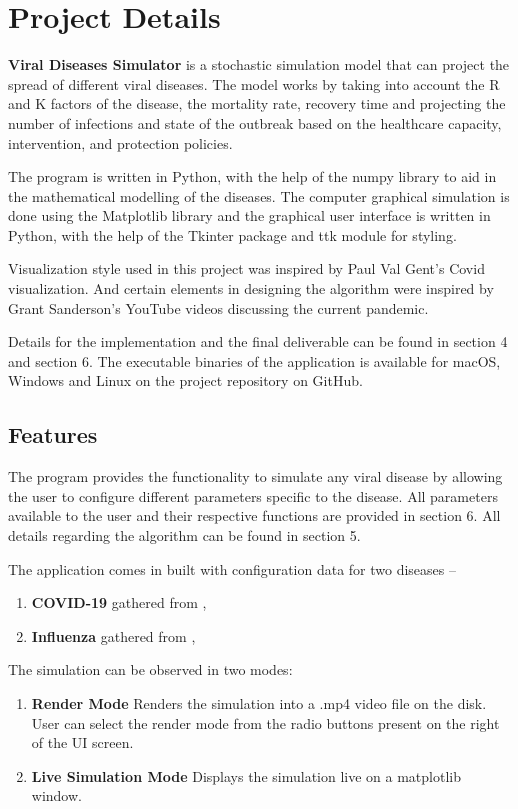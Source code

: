 \documentclass[11pt]{article}
\begin{document}
\section{Project Details}

\textbf{Viral Diseases Simulator} is a stochastic simulation model that can project the spread of different viral diseases. The model works by taking into account the R and K factors of the disease, the mortality rate, recovery time and projecting the number of infections and state of the outbreak based on the healthcare capacity, intervention, and protection policies. 

The program is written in Python, with the help of the numpy library to aid in the mathematical modelling of the diseases. The computer graphical simulation is done using the Matplotlib library and the graphical user interface is written in Python, with the help of the Tkinter package and ttk module for styling. 

Visualization style used in this project was inspired by Paul Val Gent's Covid visualization\cite{sim_ref}. And certain elements in designing the algorithm were inspired by Grant Sanderson's YouTube videos discussing the current pandemic\cite{yt1}\cite{yt2}.

Details for the implementation and the final deliverable can be found in section 4 and section 6. The executable binaries of the application is available for macOS, Windows and Linux on the project repository on GitHub. 

\subsection{Features}

The program provides the functionality to simulate any viral disease by allowing the user to configure different parameters specific to the disease. All parameters available to the user and their respective functions are provided in section 6. All details regarding the algorithm can be found in section 5.

The application comes in built with configuration data for two diseases – 
\begin{enumerate}
    \item \textbf{COVID-19} gathered from \cite{cov_ref},\cite{k_val}
    \item \textbf{Influenza} gathered from \cite{influ_ref},\cite{k_val}
\end{enumerate}

The simulation can be observed in two modes:
\begin{enumerate}
    \item \textbf{Render Mode} Renders the simulation into a .mp4 video file on the disk. User can select the render mode from the radio buttons present on the right of the UI screen. 
    \item \textbf{Live Simulation Mode} Displays the simulation live on a matplotlib window. 
\end{enumerate}
\end{document}
